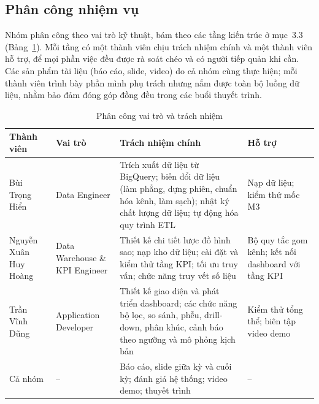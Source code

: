 \subsection{Phân công nhiệm vụ}
\label{subsec:phan-cong}

Nhóm phân công theo vai trò kỹ thuật, bám theo các tầng kiến trúc ở mục~3.3
(Bảng~\ref{tab:phan-cong}). Mỗi tầng có một thành viên chịu trách nhiệm chính và một
thành viên hỗ trợ, để mọi phần việc đều được rà soát chéo và có người tiếp quản khi
cần. Các sản phẩm tài liệu (báo cáo, slide, video) do cả nhóm cùng thực hiện; mỗi
thành viên trình bày phần mình phụ trách nhưng nắm được toàn bộ luồng dữ liệu, nhằm
bảo đảm đóng góp đồng đều trong các buổi thuyết trình.

\begin{table}[htbp]
    \centering
    \small
    \caption{Phân công vai trò và trách nhiệm}
    \label{tab:phan-cong}
    \begin{tabularx}{\textwidth}{|>{\raggedright\arraybackslash}p{2.6cm}
                                 |>{\raggedright\arraybackslash}p{2.4cm}
                                 |>{\raggedright\arraybackslash}X
                                 |>{\raggedright\arraybackslash}p{3.0cm}|}
        \hline
        \textbf{Thành viên} & \textbf{Vai trò} & \textbf{Trách nhiệm chính}
            & \textbf{Hỗ trợ} \\
        \hline
        Bùi Trọng Hiển
            & Data Engineer
            & Trích xuất dữ liệu từ BigQuery; biến đổi dữ liệu (làm phẳng, dựng phiên,
              chuẩn hóa kênh, làm sạch); nhật ký chất lượng dữ liệu; tự động hóa quy
              trình ETL
            & Nạp dữ liệu; kiểm thử mốc M3 \\
        \hline
        Nguyễn Xuân Huy Hoàng
            & Data Warehouse \& KPI Engineer
            & Thiết kế chi tiết lược đồ hình sao; nạp kho dữ liệu; cài đặt và kiểm
              thử tầng KPI; tối ưu truy vấn; chức năng truy vết số liệu
            & Bộ quy tắc gom kênh; kết nối dashboard với tầng KPI \\
        \hline
        Trần Vĩnh Dũng
            & Application Developer
            & Thiết kế giao diện và phát triển dashboard; các chức năng bộ lọc, so
              sánh, phễu, drill-down, phân khúc, cảnh báo theo ngưỡng và mô phỏng
              kịch bản
            & Kiểm thử tổng thể; biên tập video demo \\
        \hline
        Cả nhóm
            & --
            & Báo cáo, slide giữa kỳ và cuối kỳ; đánh giá hệ thống; video demo;
              thuyết trình
            & -- \\
        \hline
    \end{tabularx}
\end{table}

